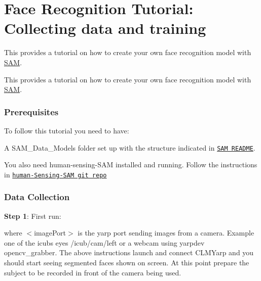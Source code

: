 \hypertarget{group__icubclient__facerecog}{}\section{Face Recognition Tutorial\+: Collecting data and training}
\label{group__icubclient__facerecog}


This provides a tutorial on how to create your own face recognition model with \hyperlink{namespaceSAM}{S\+AM}.  


This provides a tutorial on how to create your own face recognition model with \hyperlink{namespaceSAM}{S\+AM}. 

\subsubsection*{Prerequisites}

To follow this tutorial you need to have\+:


\begin{DoxyItemize}
\item A {\ttfamily S\+A\+M\+\_\+\+Data\+\_\+\+Models} folder set up with the structure indicated in \href{https://github.com/robotology/icub-client/blob/master/src/modules/SAM/README.md}{\tt S\+AM R\+E\+A\+D\+ME}.
\item You also need human-\/sensing-\/\+S\+AM installed and running. Follow the instructions in \href{https://github.com/dcam0050/human-sensing-SAM/blob/master/README.md}{\tt human-\/\+Sensing-\/\+S\+AM git repo}
\end{DoxyItemize}

\subsubsection*{Data Collection}

{\bfseries Step 1}\+: First run\+:



where {\ttfamily $<$image\+Port$>$} is the yarp port sending images from a camera. Example one of the icub\textquotesingle{}s eyes {\ttfamily /icub/cam/left} or a webcam using {\ttfamily yarpdev opencv\+\_\+grabber}. The above instructions launch and connect C\+L\+M\+Yarp and you should start seeing segmented faces shown on screen. At this point prepare the subject to be recorded in front of the camera being used.

